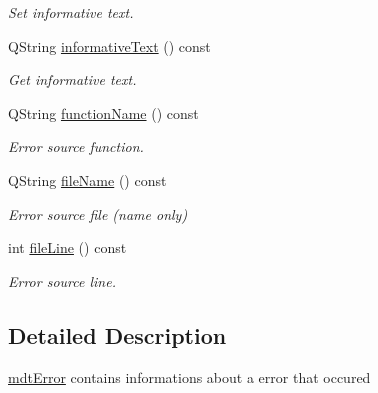 \begin{DoxyCompactItemize}
\begin{DoxyCompactList}\small\item\em Set informative text. \end{DoxyCompactList}\item 
Q\-String \hyperlink{classmdt_error_adcc1905f585c327cec8a2e31af616651}{informative\-Text} () const 
\begin{DoxyCompactList}\small\item\em Get informative text. \end{DoxyCompactList}\item 
Q\-String \hyperlink{classmdt_error_abff9bc71ff554f6f6189be88b0afa731}{function\-Name} () const 
\begin{DoxyCompactList}\small\item\em Error source function. \end{DoxyCompactList}\item 
Q\-String \hyperlink{classmdt_error_af7c2c371678ebd45698a990502addbd8}{file\-Name} () const 
\begin{DoxyCompactList}\small\item\em Error source file (name only) \end{DoxyCompactList}\item 
int \hyperlink{classmdt_error_a7f5a9ac5e896ba24009bcadddcfe79cb}{file\-Line} () const 
\begin{DoxyCompactList}\small\item\em Error source line. \end{DoxyCompactList}\end{DoxyCompactItemize}


\subsection{Detailed Description}
\hyperlink{classmdt_error}{mdt\-Error} contains informations about a error that occured 

